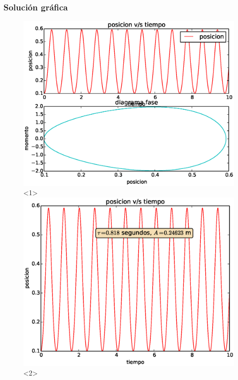\begin{frame}[fragile]
\frametitle{Solución gráfica}
\begin{figure}
	\centering
	\includegraphics[scale=0.5]{Examen3_P4_01.eps}<1>  
	\includegraphics[scale=0.5]{Examen3_P4_02.eps}<2>
\end{figure}
\end{frame}
